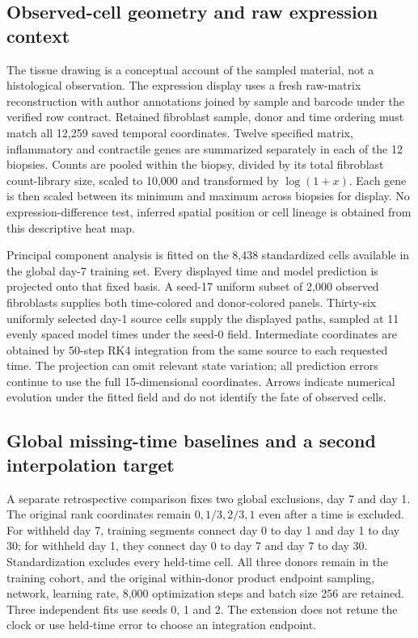 \documentclass[10pt,a4paper]{article}
\begin{document}
\subsection{Observed-cell geometry and raw expression context}
The tissue drawing is a conceptual account of the sampled material, not a histological observation. The expression display uses a fresh raw-matrix reconstruction with author annotations joined by sample and barcode under the verified row contract. Retained fibroblast sample, donor and time ordering must match all 12,259 saved temporal coordinates. Twelve specified matrix, inflammatory and contractile genes are summarized separately in each of the 12 biopsies. Counts are pooled within the biopsy, divided by its total fibroblast count-library size, scaled to 10,000 and transformed by $\log(1+x)$. Each gene is then scaled between its minimum and maximum across biopsies for display. No expression-difference test, inferred spatial position or cell lineage is obtained from this descriptive heat map.

Principal component analysis is fitted on the 8,438 standardized cells available in the global day-7 training set. Every displayed time and model prediction is projected onto that fixed basis. A seed-17 uniform subset of 2,000 observed fibroblasts supplies both time-colored and donor-colored panels. Thirty-six uniformly selected day-1 source cells supply the displayed paths, sampled at 11 evenly spaced model times under the seed-0 field. Intermediate coordinates are obtained by 50-step RK4 integration from the same source to each requested time. The projection can omit relevant state variation; all prediction errors continue to use the full 15-dimensional coordinates. Arrows indicate numerical evolution under the fitted field and do not identify the fate of observed cells.

\subsection{Global missing-time baselines and a second interpolation target}
A separate retrospective comparison fixes two global exclusions, day 7 and day 1. The original rank coordinates remain $0,1/3,2/3,1$ even after a time is excluded. For withheld day 7, training segments connect day 0 to day 1 and day 1 to day 30; for withheld day 1, they connect day 0 to day 7 and day 7 to day 30. Standardization excludes every held-time cell. All three donors remain in the training cohort, and the original within-donor product endpoint sampling, network, learning rate, 8,000 optimization steps and batch size 256 are retained. Three independent fits use seeds 0, 1 and 2. The extension does not retune the clock or use held-time error to choose an integration endpoint.
\end{document}
